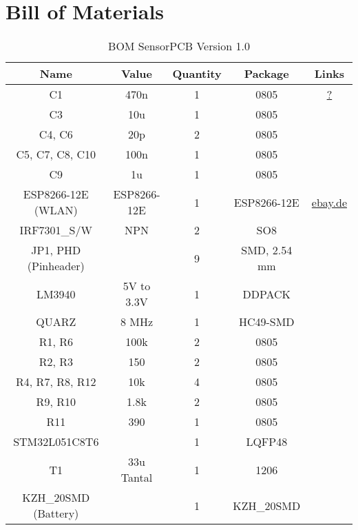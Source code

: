 \section*{Bill of Materials}

\begin{table}[h] \centering
    \begin{tabular}{|c|c|c|c|c|}\hline
    \textbf{Name}        &\textbf{Value}    & \textbf{Quantity}	    & \textbf{Package}    & \textbf{Links}\\ \hline
%
     C1    			     & 470n            & 1			            & 0805                & \url{?}\\ \hline
     C3    			     & 10u             & 1			            & 0805                & \url{}\\ \hline
     C4, C6    		     & 20p             & 2			            & 0805                & \url{}\\ \hline
     C5, C7, C8, C10     & 100n            & 1			            & 0805                & \url{}\\ \hline
     C9    			     & 1u              & 1			            & 0805                & \url{}\\ \hline
     ESP8266-12E (WLAN)  & ESP8266-12E     & 1			            & ESP8266-12E         & \url{ebay.de}\\ \hline
     IRF7301\_S/W        & NPN             & 2			            & SO8                 & \url{}\\ \hline
     JP1, PHD (Pinheader)&                 & 9			            & SMD, 2.54 mm        & \url{}\\ \hline
     LM3940    			 & 5V to 3.3V      & 1			            & DDPACK              & \url{}\\ \hline
     QUARZ    			 & 8 MHz           & 1			            & HC49-SMD            & \url{}\\ \hline
     R1, R6    		     & 100k            & 2			            & 0805                & \url{}\\ \hline
     R2, R3    			 & 150             & 2		                & 0805                & \url{}\\ \hline
     R4, R7, R8, R12     & 10k             & 4	                    & 0805                & \url{}\\ \hline
     R9, R10    	     & 1.8k            & 2			            & 0805                & \url{}\\ \hline
     R11  			     & 390             & 1			            & 0805                & \url{}\\ \hline
     STM32L051C8T6       &                 & 1			            & LQFP48              & \url{}\\ \hline
     T1    			     & 33u Tantal      & 1			            & 1206                & \url{}\\ \hline
     KZH\_20SMD (Battery)&                 & 1			            & KZH\_20SMD          & \url{}\\ \hline
 \end{tabular}
 \caption{BOM SensorPCB Version 1.0}
 \label{tab:plat}
\end{table}


